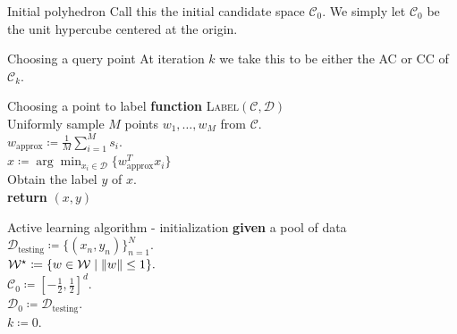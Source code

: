 \documentclass[pdf, 12pt]
{beamer}
\theoremstyle{definition}
\theoremstyle{remark}
\newcommand{\ind}{\hspace*{0.5cm}}
\newcommand{\transpose}{T}
\begin{document}
\begin{frame}{Initial polyhedron}
      Call this the initial candidate space $\mathcal{C}_0$. We simply let $\mathcal{C}_0$ be the unit hypercube centered at the origin.
\end{frame}

\begin{frame}{Choosing a query point}
      At iteration $k$ we take this to be either the AC or CC of $\mathcal{C}_k$.
\end{frame}

\begin{frame}{Choosing a point to label}
                  \ind \textbf{function} \textsc{Label}$(\mathcal{C}, \mathcal{D})$ \\
            \ind\ind Uniformly sample $M$ points $w_1, \dots, w_M$ from $\mathcal{C}$. \\
            \ind\ind $w_\text{approx} \coloneqq \frac{1}{M} \sum_{i=1}^M s_i$. \\
            \ind\ind $x \coloneqq \arg \min_{x_i \in \mathcal{D}} \{w_\text{approx}^\transpose x_i \}$ \\
            \ind\ind Obtain the label $y$ of $x$. \\
            \ind \textbf{return} $(x, y) $   
\end{frame}

\begin{frame}{Active learning algorithm - initialization}
            \ind \textbf{given} a pool of data $\mathcal{D}_\text{testing} \coloneqq \{(x_n, y_n)\}_{n=1}^N$. \\
            \ind $\mathcal{W}^\star \coloneqq \{w \in \mathcal{W} \;|\; \norm{w} \leq 1\}.$ \\
            \ind $\mathcal{C}_0 \coloneqq [-\frac{1}{2}, \frac{1}{2}]^d.$ \\
            \ind $\mathcal{D}_0 \coloneqq \mathcal{D}_\text{testing}.$ \\
            \ind $k \coloneqq 0$. \\
\end{frame}
\end{document}
